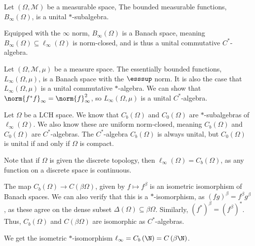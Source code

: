\documentclass[10pt]{mypackage}
\begin{document}
\begin{example}
  Let $\left(\Omega,\mathcal{M}\right)$ be a measurable space, The bounded measurable functions, $B_{\infty}\left(\Omega\right)$, is a unital $\ast$-subalgebra.\newline

  Equipped with the $\infty$ norm, $B_{\infty}\left(\Omega\right)$ is a Banach space, meaning $B_{\infty}\left(\Omega\right)\subseteq \ell_{\infty}\left(\Omega\right)$ is norm-closed, and is thus a unital commutative $C^{\ast}$-algebra.
\end{example}
\begin{example}
  Let $\left(\Omega,\mathcal{M},\mu\right)$ be a measure space. The essentially bounded functions, $L_{\infty}\left(\Omega,\mu\right)$, is a Banach space with the $\esssup$ norm. It is also the case that $L_{\infty}\left(\Omega,\mu\right)$ is a unital commutative $\ast$-algebra. We can show that $\norm{f^{\ast}f}_{\infty} = \norm{f}_{\infty}^2$, so $L_{\infty}\left(\Omega,\mu\right)$ is a unital $C^{\ast}$-algebra.
\end{example}
\begin{example}
  Let $\Omega$ be a LCH space. We know that $C_b\left(\Omega\right)$ and $C_0\left(\Omega\right)$ are $\ast$-subalgebras of $\ell_{\infty}\left(\Omega\right)$. We also know these are uniform norm-closed, meaning $C_b\left(\Omega\right)$ and $C_0\left(\Omega\right)$ are $C^{\ast}$-algebras. The $C^{\ast}$-algebra $C_b\left(\Omega\right)$ is always unital, but $C_0\left(\Omega\right)$ is unital if and only if $\Omega$ is compact.\newline

  Note that if $\Omega$ is given the discrete topology, then $\ell_{\infty}\left(\Omega\right) = C_b\left(\Omega\right)$, as any function on a discrete space is continuous.\newline

  The map $C_b\left(\Omega\right)\rightarrow C\left(\beta\Omega\right)$, given by $f\mapsto f^{\beta}$ is an isometric isomorphism of Banach spaces. We can also verify that this is a $\ast$-isomorphism, as $\left(fg\right)^{\beta} = f^{\beta}g^{\beta}$, as these agree on the dense subset $\Delta\left(\Omega\right)\subseteq \beta\Omega$. Similarly, $\left(f^{\ast}\right)^{\beta} = \left(f^{\beta}\right)^{\ast}$. Thus, $C_b\left(\Omega\right)$ and $C\left(\beta\Omega\right)$ are isomorphic as $C^{\ast}$-algebras.\newline

  We get the isometric $\ast$-isomorphism $\ell_{\infty} = C_b\left(\N\right) = C\left(\beta\N\right)$.
\end{example}
\end{document}
